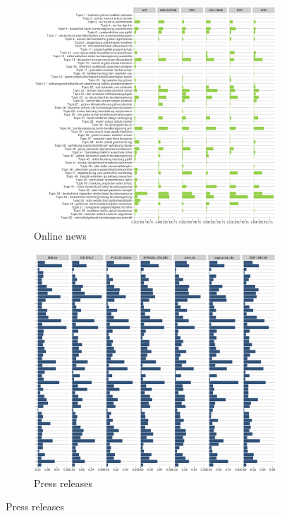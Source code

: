 \documentclass[12pt,a4paper,notitlepage]{article}
\begin{document}
\begin{figure}[H]
	\caption{Expected frequency}
	\begin{center}
		\begin{subfigure}[normla]{0.48\textwidth}
			\includegraphics[width=\textwidth]{../figs/topic_proportion_press}
			\caption{Online news}
		\end{subfigure}
		\begin{subfigure}[normla]{0.48\textwidth}
			\includegraphics[width=\textwidth]{../figs/topic_proportion_news}
			\caption{Press releases}
		\end{subfigure}
	\end{center}
\end{figure}
\end{document}
